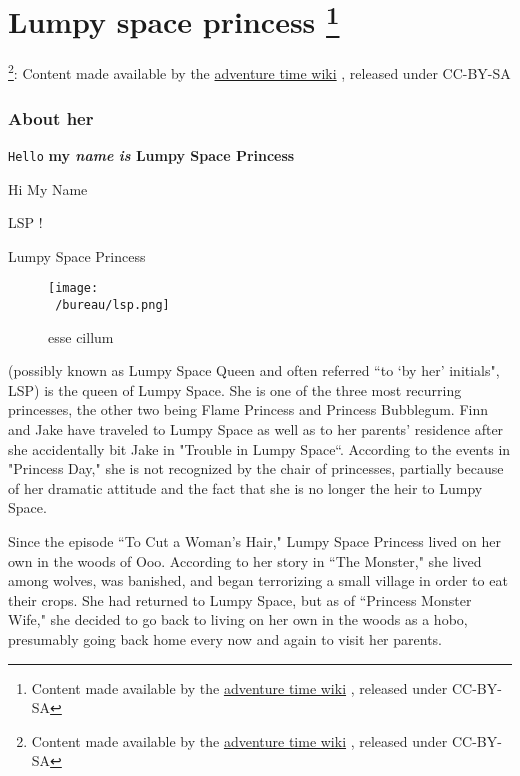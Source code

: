 \chapter{Lumpy space princess \footnote{Content made available by the \href{https://adventuretime.fandom.com/wiki/Lumpy\_Space\_Princess}{adventure time wiki} , released under CC-BY-SA}}


\footnote{Content made available by the \href{https://adventuretime.fandom.com/wiki/Lumpy\_Space\_Princess}{adventure time wiki} , released under CC-BY-SA}: Content made available by the
\href{https://adventuretime.fandom.com/wiki/Lumpy\_Space\_Princess}{adventure time wiki}
, released under CC-BY-SA
\subsection{About her}


\texttt{Hello} \textbf{my \textit{name} \textit{is} Lumpy Space Princess}
\begin{displayquote} 
   Hi
  My
  Name
 
 \end{displayquote}

\begin{displayquote} 
   LSP !
 
 \end{displayquote}

Lumpy Space Princess 
\begin{figure}
   \centering
   \texttt{[image: \\~/bureau/lsp.png]}
   \caption{esse cillum}
\end{figure} (possibly known as Lumpy Space Queen and often 
referred ``to `by her' initials", LSP) is the queen of Lumpy Space. She is one 
of the three most recurring princesses, the other two being Flame Princess 
and Princess Bubblegum. Finn and Jake have traveled to Lumpy Space as well 
as to her parents' residence after she accidentally bit Jake in "Trouble 
in Lumpy Space``. According to the events in "Princess Day," she is not 
recognized by the chair of princesses, partially because of her dramatic 
attitude and the fact that she is no longer the heir to Lumpy Space. 


Since the episode ``To Cut a Woman's Hair," Lumpy Space Princess lived on 
her own in the woods of Ooo. According to her story in ``The Monster," she 
lived among wolves, was banished, and began terrorizing a small village in 
order to eat their crops. She had returned to Lumpy Space, but as of 
``Princess Monster Wife," she decided to go back to living on her own in the 
woods as a hobo, presumably going back home every now and again to visit 
her parents. 


